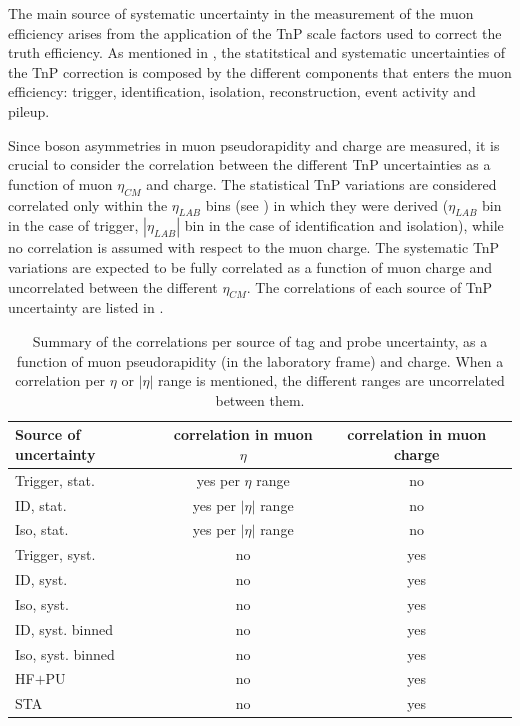 The main source of systematic uncertainty in the measurement of the muon efficiency arises from the application of the TnP scale factors used to correct the truth efficiency. As mentioned in , the statitstical and systematic uncertainties of the TnP correction is composed by the different components that enters the muon efficiency: trigger, identification, isolation, reconstruction, event activity and pileup.

Since \W boson asymmetries in muon pseudorapidity and charge are measured, it is crucial to consider the correlation between the different TnP uncertainties as a function of muon $\eta_{CM}$ and charge. The statistical TnP variations are considered correlated only within the $\eta_{LAB}$ bins (see \cite{Muon_TnP_pPb}) in which they were derived ($\eta_{LAB}$ bin in the case of trigger, $|\eta_{LAB}|$ bin in the case of identification and isolation), while no correlation is assumed with respect to the muon charge. The systematic TnP variations are expected to be fully correlated as a function of muon charge and uncorrelated between the different $\eta_{CM}$. The correlations of each source of TnP uncertainty are listed in .

\begin{table}[!htb]
 \begin{center}
 \begin{tabular}{l|c|c}
 \hline
 Source of uncertainty & correlation in muon $\eta$ & correlation in muon charge \\
 \hline
 Trigger, stat. & yes per $\eta$ range & no \\
 ID, stat. & yes per $|\eta|$ range & no \\
 Iso, stat. & yes per $|\eta|$ range & no \\
 Trigger, syst. & no & yes \\
 ID, syst. & no & yes \\
 Iso, syst. & no & yes \\
 ID, syst. binned & no & yes \\
 Iso, syst. binned & no & yes \\
 HF$+$PU & no & yes \\
 STA & no & yes \\
 \hline
 \end{tabular}
 \end{center}
 \caption{Summary of the correlations per source of tag and probe uncertainty, as a function of muon pseudorapidity (in the laboratory frame) and charge. When a correlation per $\eta$ or $|\eta|$ range is mentioned, the different ranges are uncorrelated between them.}
 \label{tab:systcorr}
\end{table}

